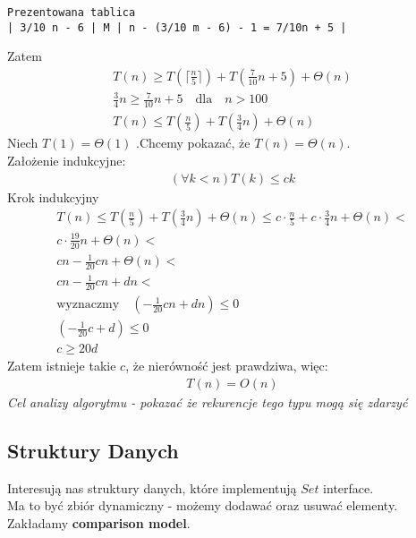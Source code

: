 \documentclass{article}
\numberwithin{equation}{subsection}
\begin{document}
\begin{verbatim}
Prezentowana tablica
| 3/10 n - 6 | M | n - (3/10 m - 6) - 1 = 7/10n + 5 |
\end{verbatim}
Zatem
\begin{align}
T(n) \geq T\left(\lceil \frac{n}{5} \rceil\right) + T\left(\frac{7}{10}n + 5\right) + \Theta(n)\\
\frac{3}{4} n \geq \frac{7}{10}n + 5 \quad \text{dla} \quad n>100\\
T(n) \leq T\left(\frac{n}{5}\right) + T\left(\frac{3}{4}n\right) + \Theta(n)
\end{align}
Niech $T(1)=\Theta(1)$ .Chcemy pokazać, że $T(n) = \Theta(n)$.\\
Założenie indukcyjne:
\begin{align}
    \left(\forall k<n\right) T(k) \leq ck
\end{align}
Krok indukcyjny
\begin{align}
    T(n) \leq T\left(\frac{n}{5}\right) + T\left(\frac{3}{4}n\right) + \Theta(n) \leq c\cdot \frac{n}{5} + c\cdot \frac{3}{4} n + \Theta(n) <\\ 
    c \cdot \frac{19}{20} n + \Theta(n) <\\
    cn - \frac{1}{20} cn + \Theta(n) <\\
    cn - \frac{1}{20} cn + dn <\\
    \text{wyznaczmy} \quad \left(-\frac{1}{20} cn + dn\right) \leq 0\\
    \left(-\frac{1}{20} c + d\right) \leq 0\\
    c \geq 20 d
\end{align}
Zatem istnieje takie $c$, że nierówność jest prawdziwa, więc:
\begin{align}
    T(n) = O(n)
\end{align}
\textit{Cel analizy algorytmu - pokazać że rekurencje tego typu mogą się zdarzyć}

\subsection{Struktury Danych}

Interesują nas struktury danych, które implementują $Set$ interface.\\
Ma to być zbiór dynamiczny - możemy dodawać oraz usuwać elementy.\\
Zakładamy \textbf{comparison model}.\\
\end{document}
